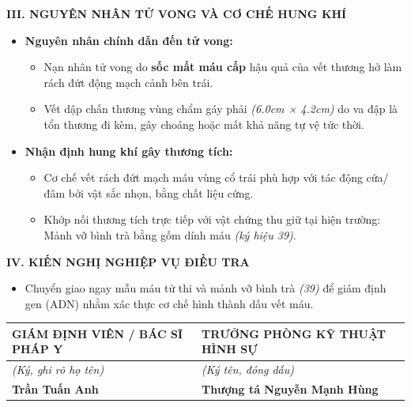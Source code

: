 \documentclass[12pt,a4paper]{article}
\begin{document}
\vspace{0.3cm}\noindent\textbf{\large III. NGUYÊN NHÂN TỬ VONG VÀ CƠ CHẾ HUNG KHÍ}\\[0.15cm]


\begin{itemize}[leftmargin=*, itemsep=2pt, topsep=2pt, parsep=0pt]
  \item \textbf{Nguyên nhân chính dẫn đến tử vong:}
\begin{itemize}[leftmargin=*, itemsep=2pt, topsep=2pt, parsep=0pt]
  \item Nạn nhân tử vong do \textbf{sốc mất máu cấp} hậu quả của vết thương hở làm rách đứt động mạch cảnh bên trái.
  \item Vết dập chấn thương vùng chẩm gáy phải \textit{(6.0cm × 4.2cm)} do va đập là tổn thương đi kèm, gây choáng hoặc mất khả năng tự vệ tức thời.

\end{itemize}
  \item \textbf{Nhận định hung khí gây thương tích:}
\begin{itemize}[leftmargin=*, itemsep=2pt, topsep=2pt, parsep=0pt]
  \item Cơ chế vết rách đứt mạch máu vùng cổ trái phù hợp với tác động cứa/đâm bởi vật sắc nhọn, bằng chất liệu cứng.
  \item Khớp nối thương tích trực tiếp với vật chứng thu giữ tại hiện trường: Mảnh vỡ bình trà bằng gốm dính máu \textit{(ký hiệu 39)}.


\end{itemize}
\end{itemize}

\vspace{0.3cm}\noindent\textbf{\large IV. KIẾN NGHỊ NGHIỆP VỤ ĐIỀU TRA}\\[0.15cm]


\begin{itemize}[leftmargin=*, itemsep=2pt, topsep=2pt, parsep=0pt]
  \item Chuyển giao ngay mẫu máu tử thi và mảnh vỡ bình trà \textit{(39)} để giám định gen (ADN) nhằm xác thực cơ chế hình thành dấu vết máu.


\end{itemize}

\vspace{0.6cm}
\noindent
\begin{tabularx}{\textwidth}{YY}
\toprule
\textbf{GIÁM ĐỊNH VIÊN / BÁC SĨ PHÁP Y} & \textbf{TRƯỞNG PHÒNG KỸ THUẬT HÌNH SỰ} \\
\midrule
\textit{(Ký, ghi rõ họ tên)} & \textit{(Ký tên, đóng dấu)} \\[1.5cm]
\textbf{Trần Tuấn Anh} & \textbf{Thượng tá Nguyễn Mạnh Hùng} \\
\bottomrule
\end{tabularx}
\end{document}
